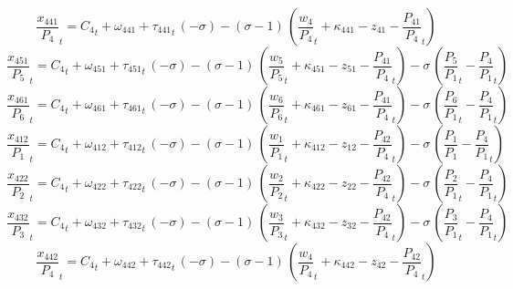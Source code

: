 \begin{dmath}
{{\frac{x_{441}}{P_{4}}}}_{t}={{C_{4}}}_{t}+{{\omega_{441}}}+{{\tau_{441}}}_{t}\, \left(-{{\sigma}}\right)-\left({{\sigma}}-1\right)\, \left({{\frac{w_{4}}{P_{4}}}}_{t}+{{\kappa_{441}}}-{{z_{41}}}-{{\frac{P_{41}}{P_{4}}}}_{t}\right)
\end{dmath}
\begin{dmath}
{{\frac{x_{451}}{P_{5}}}}_{t}={{C_{4}}}_{t}+{{\omega_{451}}}+{{\tau_{451}}}_{t}\, \left(-{{\sigma}}\right)-\left({{\sigma}}-1\right)\, \left({{\frac{w_{5}}{P_{5}}}}_{t}+{{\kappa_{451}}}-{{z_{51}}}-{{\frac{P_{41}}{P_{4}}}}_{t}\right)-{{\sigma}}\, \left({{\frac{P_{5}}{P_{1}}}}_{t}-{{\frac{P_{4}}{P_{1}}}}_{t}\right)
\end{dmath}
\begin{dmath}
{{\frac{x_{461}}{P_{6}}}}_{t}={{C_{4}}}_{t}+{{\omega_{461}}}+{{\tau_{461}}}_{t}\, \left(-{{\sigma}}\right)-\left({{\sigma}}-1\right)\, \left({{\frac{w_{6}}{P_{6}}}}_{t}+{{\kappa_{461}}}-{{z_{61}}}-{{\frac{P_{41}}{P_{4}}}}_{t}\right)-{{\sigma}}\, \left({{\frac{P_{6}}{P_{1}}}}_{t}-{{\frac{P_{4}}{P_{1}}}}_{t}\right)
\end{dmath}
\begin{dmath}
{{\frac{x_{412}}{P_{1}}}}_{t}={{C_{4}}}_{t}+{{\omega_{412}}}+{{\tau_{412}}}_{t}\, \left(-{{\sigma}}\right)-\left({{\sigma}}-1\right)\, \left({{\frac{w_{1}}{P_{1}}}}_{t}+{{\kappa_{412}}}-{{z_{12}}}-{{\frac{P_{42}}{P_{4}}}}_{t}\right)-{{\sigma}}\, \left({{\frac{P_{1}}{P_{1}}}}-{{\frac{P_{4}}{P_{1}}}}_{t}\right)
\end{dmath}
\begin{dmath}
{{\frac{x_{422}}{P_{2}}}}_{t}={{C_{4}}}_{t}+{{\omega_{422}}}+{{\tau_{422}}}_{t}\, \left(-{{\sigma}}\right)-\left({{\sigma}}-1\right)\, \left({{\frac{w_{2}}{P_{2}}}}_{t}+{{\kappa_{422}}}-{{z_{22}}}-{{\frac{P_{42}}{P_{4}}}}_{t}\right)-{{\sigma}}\, \left({{\frac{P_{2}}{P_{1}}}}_{t}-{{\frac{P_{4}}{P_{1}}}}_{t}\right)
\end{dmath}
\begin{dmath}
{{\frac{x_{432}}{P_{3}}}}_{t}={{C_{4}}}_{t}+{{\omega_{432}}}+{{\tau_{432}}}_{t}\, \left(-{{\sigma}}\right)-\left({{\sigma}}-1\right)\, \left({{\frac{w_{3}}{P_{3}}}}_{t}+{{\kappa_{432}}}-{{z_{32}}}-{{\frac{P_{42}}{P_{4}}}}_{t}\right)-{{\sigma}}\, \left({{\frac{P_{3}}{P_{1}}}}_{t}-{{\frac{P_{4}}{P_{1}}}}_{t}\right)
\end{dmath}
\begin{dmath}
{{\frac{x_{442}}{P_{4}}}}_{t}={{C_{4}}}_{t}+{{\omega_{442}}}+{{\tau_{442}}}_{t}\, \left(-{{\sigma}}\right)-\left({{\sigma}}-1\right)\, \left({{\frac{w_{4}}{P_{4}}}}_{t}+{{\kappa_{442}}}-{{z_{42}}}-{{\frac{P_{42}}{P_{4}}}}_{t}\right)
\end{dmath}
